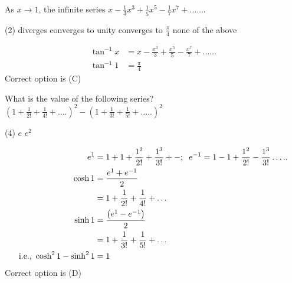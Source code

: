 \begin{questions}
\section*{}

\begin{minipage}{\textwidth}
	\question As $x \rightarrow 1$, the infinite series $x-\frac{1}{3} x^{3}+\frac{1}{5} x^{5}-\frac{1}{7} x^{7}+\ldots \ldots .$
\end{minipage}
\begin{tasks}(2)
	\task[\textbf{A.}] diverges
	\task[\textbf{B.}] converges to unity
	\task[\textbf{C.}]converges to $\frac{\pi}{4}$
	\task[\textbf{D.}]none of the above
\end{tasks}
\begin{answer}
	\begin{align*}
	\tan ^{-1} x&=x-\frac{x^{3}}{3}+\frac{x^{5}}{5}-\frac{x^{7}}{7}+\ldots \ldots \\ \tan ^{-1} 1&=\frac{\pi}{4}
	\end{align*}
	Correct option is (C)
\end{answer}

\begin{minipage}{\textwidth}
	\question What is the value of the following series?\\
	$\left(1+\frac{1}{2 !}+\frac{1}{4 !}+\ldots .\right)^{2}-\left(1+\frac{1}{3 !}+\frac{1}{5 !}+\ldots . .\right)^{2}$
\end{minipage}
\begin{tasks}(4)
	\task[\textbf{B.}]$e$
	\task[\textbf{C.}]$e^{2}$
\end{tasks}
\begin{answer}
	\begin{align*}
	e^{1}&=1+1+\frac{1^{2}}{2 !}+\frac{1^{3}}{3 !}+-; \hspace{0.2cm} e^{-1}=1-1+\frac{1^{2}}{2 !}-\frac{1^{3}}{3 !} \ldots . .\\
	\cosh 1&=\frac{e^{1}+e^{-1}}{2}\\&=1+\frac{1}{2 !}+\frac{1}{4 !}+\ldots\\
	\sinh 1&=\frac{\left(e^{1}-e^{-1}\right)}{2}\\&=1+\frac{1}{3 !}+\frac{1}{5 !}+\ldots\\
	\text{i.e.,}\ \cosh ^{2} 1-\sinh ^{2} 1&=1
	\end{align*}
	Correct option is (D)
\end{answer}


\end{questions}
